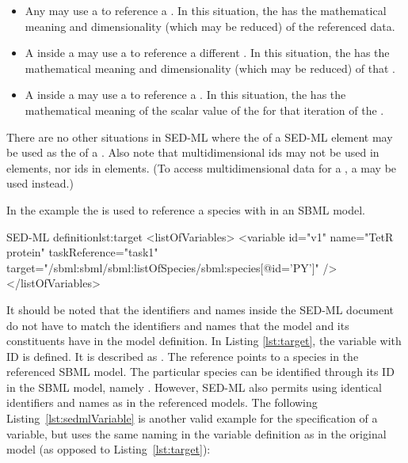 \begin{itemize}
        \item Any \Variable may use a  to reference a \DataSource.  In this situation, the \Variable has the mathematical meaning and dimensionality (which may be reduced) of the referenced data.

        \item A \Variable inside a \DataGenerator may use a  to reference a different \DataGenerator.  In this situation, the \Variable has the mathematical meaning and dimensionality (which may be reduced) of that \DataGenerator.

        \item A \Variable inside a \RepeatedTask may use a  to reference a \Range.  In this situation, the \Variable has the mathematical meaning of the scalar value of the \Range for that iteration of the \RepeatedTask.
\end{itemize}

There are no other situations in SED-ML where the  of a SED-ML element may be used as the  of a \Variable.  Also note that multidimensional \DataSource ids may not be used in \RepeatedTask elements, nor \Range ids in \DataGenerator elements.  (To access multidimensional data for a \Range, a \DataRange may be used instead.)

In the example the  is used to reference a species with  in an SBML model.
\begin{myXmlLst}{SED-ML  definition}{lst:target}
<listOfVariables>
	<variable id="v1" name="TetR protein" taskReference="task1" 
		target="/sbml:sbml/sbml:listOfSpecies/sbml:species[@id='PY']" />
</listOfVariables>
\end{myXmlLst}

It should be noted that the identifiers and names inside the SED-ML document do not have to match the identifiers and names that the model and its constituents have in the model definition. In Listing \ref{lst:target}, the variable with ID  is defined. It is described as . The reference points to a species in the referenced SBML model. The particular species can be identified through its ID in the SBML model, namely . However, SED-ML also permits using identical identifiers and names as in the referenced models. The following Listing~\vref{lst:sedmlVariable} is another valid example for the specification of a variable, but uses the same naming in the variable definition as in the original model (as opposed to Listing~\ref{lst:target}):

